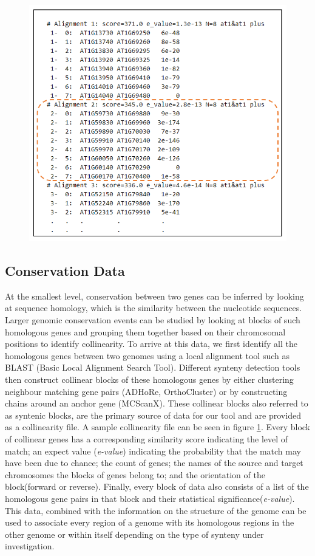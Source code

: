 \begin{figure}
  \centering
  \includegraphics[width=.675\linewidth]{images/ch_3_coll_file.PNG}
  \label{fig:ch_3_coll_file}
\end{figure}



\subsection{Conservation Data}
At the smallest level, conservation between two genes can be inferred by looking at sequence homology, which is the similarity between the nucleotide sequences. Larger genomic conservation events can be studied by looking at blocks of such homologous genes and grouping them together based on their chromosomal positions to identify collinearity. To arrive at this data, we first identify all the homologous genes between two genomes using a local alignment tool such as BLAST (Basic Local Alignment Search Tool)\cite{blasttool}. Different synteny detection tools then construct collinear blocks of these homologous genes by either clustering neighbour matching gene pairs (ADHoRe, OrthoCluster) \cite{proost2011adhore,zeng2008orthocluster} or by constructing chains around an anchor gene (MCScanX)\cite{wang2012mcscanx}. These collinear blocks also referred to as syntenic blocks, are the primary source of data for our tool and are provided as a collinearity file. A sample collinearity file can be seen in figure \ref{fig:ch_3_coll_file}. Every block of collinear genes has a corresponding similarity score indicating the level of match; an expect value (\textit{e-value}) indicating the probability that the match may have been due to chance; the count of genes; the names of the source and target chromosomes the blocks of genes belong to; and the orientation of the block(forward or reverse). Finally, every block of data also consists of a list of the homologous gene pairs in that block and their statistical significance(\textit{e-value}). This data, combined with the information on the structure of the genome can be used to associate every region of a genome with its homologous regions in the other genome or within itself depending on the type of synteny under investigation.


